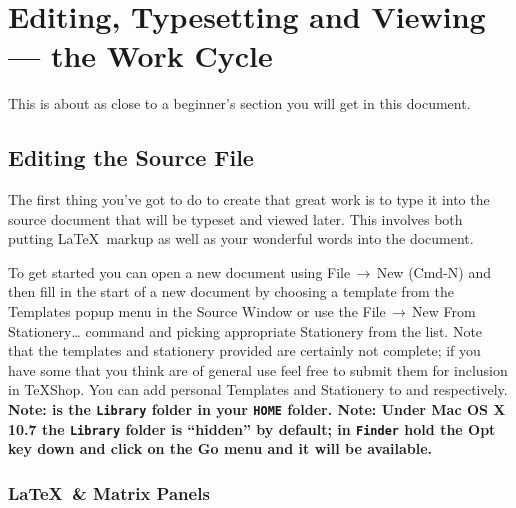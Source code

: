 \documentclass[letterpaper,11pt]{article}
\newcommand{\TS}{\textsf{\TeX Shop}}
\newcommand{\cmd}[1]{\textsf{#1}}
\newcommand{\mnu}[1]{\textsf{#1}}
\newcommand{\To}{\,\(\to\)\,}
\begin{document}
\section{Editing, Typesetting and Viewing --- the Work Cycle}

This is about as close to a beginner's section you will get in this document.

\subsection{Editing the Source File}

The first thing you've got to do to create that great work is to type it into the source document that will be typeset and viewed later. This involves both putting \LaTeX\ markup as well as your wonderful words into the document.

To get started you can open a new document using \mnu{File}\To\mnu{New} (\cmd{Cmd-N}) and then fill in the start of a new document by choosing a template from the \mnu{Templates} popup menu in the Source Window or use the \mnu{File}\To\mnu{New From Stationery…} command and picking appropriate Stationery from the list. Note that the templates and stationery provided are certainly not complete; if you have some that you think are of general use feel free to submit them for inclusion in \TS. You can add personal Templates and Stationery to  and  respectively. \textbf{Note:  is the \texttt{Library} folder in your \texttt{HOME} folder. Note: Under \textsf{Mac OS X 10.7} the \texttt{Library} folder is ``hidden'' by default; in \texttt{Finder} hold the \cmd{Opt} key down and click on the \mnu{Go} menu and it will be available.}

\subsubsection{\LaTeX\ \& Matrix Panels}
\end{document}

